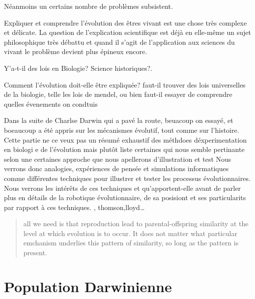 Néanmoins un certains nombre de problèmes subsistent. 


Expliquer et comprendre l'évolution des êtres vivant est une chose très complexe et délicate. La question de l'explication scientifique est déjà en elle-même un sujet philosophique très débattu et quand il s'agit de l'application aux sciences du vivant le problème devient plus épineux encore.

Y'a-t-il des lois en Biologie? Science historiques?.

Comment l'évolution doit-elle être expliquée? faut-il trouver des lois universelles de la biologie, telle les lois de mendel, ou bien faut-il essayer de comprendre quelles évenements on condtuis 

Dans la suite de Charlse Darwin qui a pavé la route, beuacoup on essayé, et boeaucoup a été appris sur les mécanismes évolutif, tout comme sur l'histoire. Cette partie ne ce veux pas un résumé exhaustif des méthdoes déxperimentation en biologi e de l'évolution mais plutôt liste certaines qui nous semble pertinante selon une certaines approche que nous apellerons d'illustration et test
Nous verrons donc analogies, expériences de pensée et simulations informatiques comme différentes techniques pour illustrer et tester les processus évolutionnaires.  Nous verrons les intérêts de ces techniques et qu'apportent-elle avant de parler plus en détails de la robotique évolutionnaire, de sa posisiont et ses particularits par rapport à ces techniques.
\cite{beatty1980whatswrongwithreceivedwiew}, thomson,lloyd\ldots
\cite{brandon78adaptationevolutionarytheory}

\begin{quote}
	all we need is that reproduction lead to parental-offspring similarity at the level at which evolution is to occur. It does not matter what particular emchanism underlies this pattern of similarity, so long as the pattern is present.\\
	\citep[p. 34]{godfrey2009darwinian}
\end{quote}

\section{Population Darwinienne}
